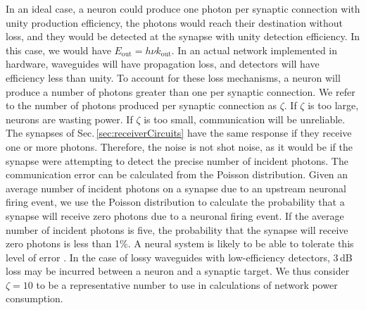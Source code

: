 \documentclass[twocolumn]{article}
\begin{document}
In an ideal case, a neuron could produce one photon per synaptic connection with unity production efficiency, the photons would reach their destination without loss, and they would be detected at the synapse with unity detection efficiency. In this case, we would have $E_{\mathrm{out}} = h\nu k_{\mathrm{out}}$. In an actual network implemented in hardware, waveguides will have propagation loss, and detectors will have efficiency less than unity. To account for these loss mechanisms, a neuron will produce a number of photons greater than one per synaptic connection. We refer to the number of photons produced per synaptic connection as $\zeta$. If $\zeta$ is too large, neurons are wasting power. If $\zeta$ is too small, communication will be unreliable. The synapses of Sec.\,\ref{sec:receiverCircuits} have the same response if they receive one or more photons. Therefore, the noise is not shot noise, as it would be if the synapse were attempting to detect the precise number of incident photons. The communication error can be calculated from the Poisson distribution. Given an average number of incident photons on a synapse due to an upstream neuronal firing event, we use the Poisson distribution to calculate the probability that a synapse will receive zero photons due to a neuronal firing event. If the average number of incident photons is five, the probability that the synapse will receive zero photons is less than 1\%. A neural system is likely to be able to tolerate this level of error \cite{stgo2005}. In the case of lossy waveguides with low-efficiency detectors, 3\,dB loss may be incurred between a neuron and a synaptic target. We thus consider $\zeta = 10$ to be a representative number to use in calculations of network power consumption.
\end{document}
